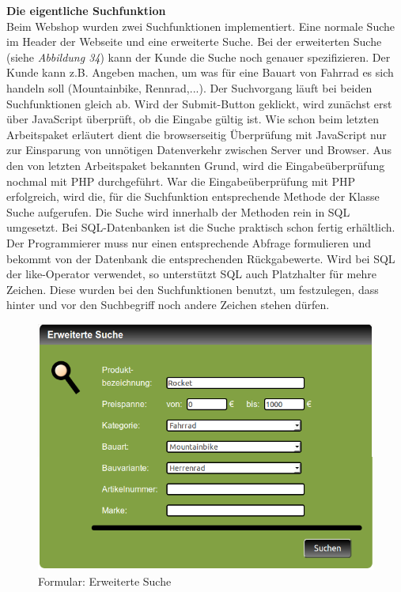 \textbf{Die eigentliche Suchfunktion}\\
Beim Webshop wurden zwei Suchfunktionen implementiert. Eine \glqq normale\grqq{} Suche im Header der Webseite und eine \glqq erweiterte\grqq{} Suche. Bei der erweiterten Suche (siehe \textit{Abbildung 34}) kann der Kunde die Suche noch genauer spezifizieren. Der Kunde kann z.B. Angeben machen, um was für eine Bauart von Fahrrad es sich handeln soll (Mountainbike, Rennrad,...). Der Suchvorgang läuft bei beiden Suchfunktionen gleich ab. Wird der Submit-Button geklickt, wird zunächst erst über JavaScript überprüft, ob die Eingabe gültig ist. Wie schon beim letzten Arbeitspaket erläutert dient die browserseitig Überprüfung mit JavaScript nur zur Einsparung von unnötigen Datenverkehr zwischen Server und Browser. Aus den von letzten Arbeitspaket bekannten Grund, wird die Eingabeüberprüfung nochmal mit PHP durchgeführt. War die Eingabeüberprüfung mit PHP erfolgreich, wird die, für die Suchfunktion entsprechende Methode der Klasse \glqq Suche\grqq{} aufgerufen. Die Suche wird innerhalb der Methoden rein in SQL umgesetzt. Bei SQL-Datenbanken ist die Suche praktisch schon fertig erhältlich. Der Programmierer muss nur einen entsprechende Abfrage formulieren und bekommt von der Datenbank die entsprechenden Rückgabewerte. Wird bei SQL der \glqq like\grqq{}-Operator verwendet, so unterstützt SQL auch Platzhalter für mehre Zeichen. Diese wurden bei den Suchfunktionen benutzt, um festzulegen, dass hinter und vor den Suchbegriff noch andere Zeichen stehen dürfen.

\begin{figure}[H]
	\begin{center}
			\includegraphics[width=115mm]{Bilder/erweiterte_suche.png}
	\end{center}
	\caption{Formular: Erweiterte Suche}
\end{figure}

